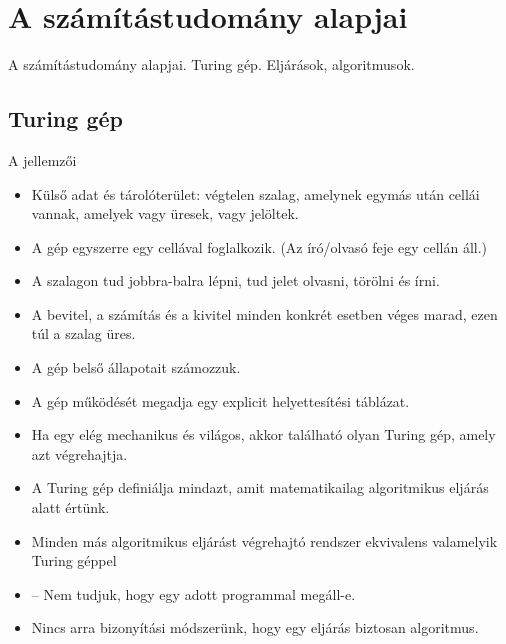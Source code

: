 \documentclass[../../main.tex]{subfiles}
\begin{document}
\section{A számítástudomány alapjai}

\begin{fulltheorem}
	A számítástudomány alapjai. Turing gép. Eljárások, algoritmusok.
\end{fulltheorem}

\subsection{Turing gép}

A  jellemzői

\begin{itemize}
	\item Külső adat és tárolóterület:
	      végtelen szalag, amelynek egymás után cellái vannak,
	      amelyek vagy üresek, vagy jelöltek.

	\item A gép egyszerre egy cellával foglalkozik.
	      (Az író/olvasó feje egy cellán áll.)

	\item A szalagon tud jobbra-balra lépni,
	      tud jelet olvasni, törölni és írni.

	\item A bevitel, a számítás és a kivitel minden
	      konkrét esetben véges marad, ezen túl a szalag üres.

	\item A gép belső állapotait számozzuk.

	\item A gép működését megadja egy explicit helyettesítési táblázat.

	\item Ha egy  elég mechanikus és világos,
	      akkor található olyan Turing gép, amely azt végrehajtja.

	\item A Turing gép definiálja mindazt,
	      amit matematikailag algoritmikus eljárás alatt értünk.

	\item Minden más algoritmikus eljárást végrehajtó rendszer
	      ekvivalens valamelyik Turing géppel

	\item {}
	      -- Nem tudjuk, hogy egy adott programmal megáll-e.

	\item Nincs arra bizonyítási módszerünk,
	      hogy egy eljárás biztosan algoritmus.
\end{itemize}
\end{document}
